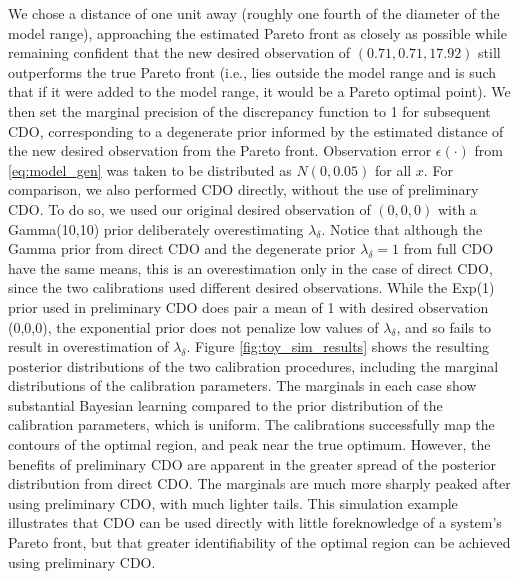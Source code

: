\documentclass[12pt]{article}
\begin{document}
%
We chose a distance of one unit away (roughly one fourth of the diameter of the model range), approaching the estimated Pareto front as closely as possible while remaining confident that the new desired observation of $(0.71, 0.71, 17.92)$ still outperforms the true Pareto front (i.e., lies outside the model range and is such that if it were added to the model range, it would be a Pareto optimal point).
%
We then set the marginal precision of the discrepancy function to 1 for subsequent CDO, corresponding to a degenerate prior informed by the estimated distance of the new desired observation from the Pareto front.
%
Observation error $\epsilon(\cdot)$ from \eqref{eq:model_gen} was taken to be distributed as $N(0,0.05)$ for all $x$.
%
For comparison, we also performed CDO directly, without the use of preliminary CDO.
%
To do so, we used our original desired observation of $(0,0,0)$ with a Gamma(10,10) prior deliberately overestimating $\lambda_\delta$.
%
Notice that although the Gamma prior from direct CDO and the degenerate prior $\lambda_\delta=1$ from full CDO have the same means, this is an overestimation only in the case of direct CDO, since the two calibrations used different desired observations.
%
While the Exp(1) prior used in preliminary CDO does pair a mean of 1 with desired observation (0,0,0), the exponential prior does not penalize low values of $\lambda_\delta$, and so fails to result in overestimation of $\lambda_\delta$.
%
Figure \ref{fig:toy_sim_results} shows the resulting posterior distributions of the two calibration procedures, including the marginal distributions of the calibration parameters. 
%
The marginals in each case show substantial Bayesian learning compared to the prior distribution of the calibration parameters, which is uniform. 
%
The calibrations successfully map the contours of the optimal region, and peak near the true optimum. 
%
However, the benefits of preliminary CDO are apparent in the greater spread of the posterior distribution from direct CDO.
%
The marginals are much more sharply peaked after using preliminary CDO, with much lighter tails.
%
%
This simulation example illustrates that CDO can be used directly with little foreknowledge of a system's Pareto front, but that greater identifiability of the optimal region can be achieved using preliminary CDO.
\end{document}
